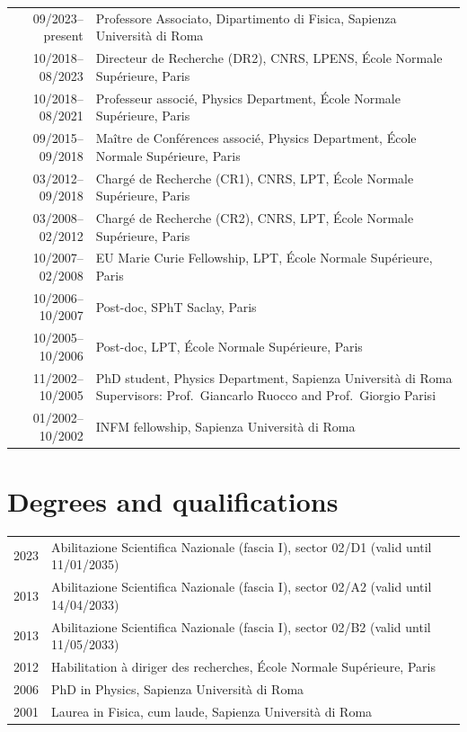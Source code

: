\documentclass[a4paper,10pt]{article}
\begin{document}
\begin{tabularx}{\textwidth}{@{}D L@{}}
09/2023--present & Professore Associato, Dipartimento di Fisica, Sapienza Università di Roma \\
10/2018--08/2023 & Directeur de Recherche (DR2), CNRS, LPENS, École Normale Supérieure, Paris \\
10/2018--08/2021 & Professeur associé, Physics Department, École Normale Supérieure, Paris \\
09/2015--09/2018 & Maître de Conférences associé, Physics Department, École Normale Supérieure, Paris \\
03/2012--09/2018 & Chargé de Recherche (CR1), CNRS, LPT, École Normale Supérieure, Paris \\
03/2008--02/2012 & Chargé de Recherche (CR2), CNRS, LPT, École Normale Supérieure, Paris \\
10/2007--02/2008 & EU Marie Curie Fellowship, LPT, École Normale Supérieure, Paris \\
10/2006--10/2007 & Post-doc, SPhT Saclay, Paris \\
10/2005--10/2006 & Post-doc, LPT, École Normale Supérieure, Paris \\
11/2002--10/2005 & PhD student, Physics Department, Sapienza Università di Roma \newline
                     {\small Supervisors: Prof.~Giancarlo Ruocco and Prof.~Giorgio Parisi} \\
01/2002--10/2002 & INFM fellowship, Sapienza Università di Roma \\
\end{tabularx}

\section{Degrees and qualifications}

\begin{tabularx}{\textwidth}{@{}D L@{}}
2023 & Abilitazione Scientifica Nazionale (fascia I), sector 02/D1 (valid until 11/01/2035) \\
2013 & Abilitazione Scientifica Nazionale (fascia I), sector 02/A2 (valid until 14/04/2033) \\
2013 & Abilitazione Scientifica Nazionale (fascia I), sector 02/B2 (valid until 11/05/2033) \\
2012 & Habilitation à diriger des recherches, École Normale Supérieure, Paris \\
2006 & PhD in Physics, Sapienza Università di Roma \\
2001 & Laurea in Fisica, cum laude, Sapienza Università di Roma \\
\end{tabularx}
\end{document}

